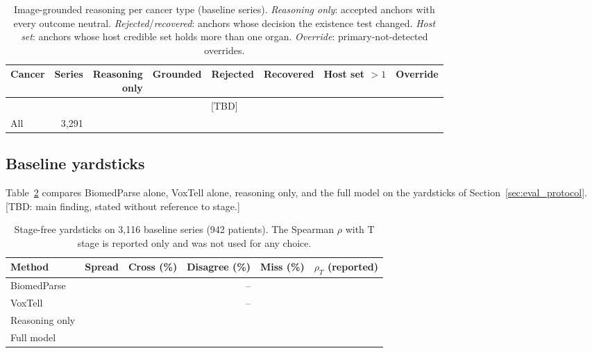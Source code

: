 \documentclass[fleqn,10pt]{olplainarticle}
\begin{document}
\begin{table}[t]
\centering\small
\caption{Image-grounded reasoning per cancer type (baseline series). \emph{Reasoning only}: accepted anchors with
every outcome neutral. \emph{Rejected}/\emph{recovered}: anchors whose decision the existence test changed. \emph{Host
set}: anchors whose host credible set holds more than one organ. \emph{Override}: primary-not-detected overrides.}
\label{tab:r2_by_type}
\setlength{\tabcolsep}{4pt}\footnotesize
\begin{tabular}{lrrrrrrr}
\hline
Cancer & Series & \shortstack{Reasoning\\only} & Grounded & Rejected & Recovered & \shortstack{Host\\set $>1$} & Override\\
\hline
\multicolumn{8}{c}{[TBD]}\\
\hline
All & 3{,}291 & & & & & & \\
\hline
\end{tabular}
\end{table}

\subsection{Baseline yardsticks}
\label{sec:results_yardsticks}
Table~\ref{tab:yardsticks} compares BiomedParse alone, VoxTell alone, reasoning only, and the full model on the
yardsticks of Section~\ref{sec:eval_protocol}. [TBD: main finding, stated without reference to stage.]

\begin{table}[t]
\centering\small
\caption{Stage-free yardsticks on 3{,}116 baseline series (942 patients). The Spearman $\rho$ with T stage is reported
only and was not used for any choice.}
\label{tab:yardsticks}
\begin{tabular}{lrrrrr}
\hline
Method & Spread & Cross (\%) & Disagree (\%) & Miss (\%) & $\rho_T$ (reported)\\
\hline
BiomedParse & & & -- & & \\
VoxTell & & & -- & & \\
Reasoning only & & & & & \\
Full model & & & & & \\
\hline
\end{tabular}
\end{table}
\end{document}
